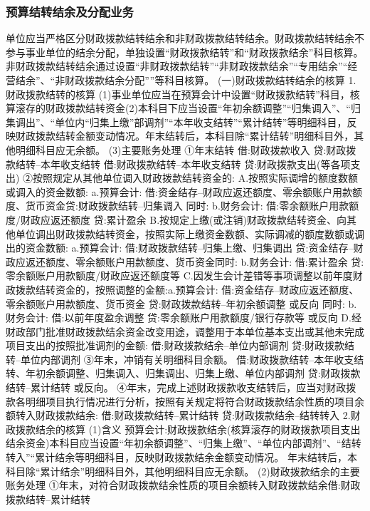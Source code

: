 \documentclass[UTF8,12pt]{ctexart}
\numberwithin{equation}{section} %
\numberwithin{figure}{section}
\numberwithin{table}{section}
\begin{document}
	\subsubsection{预算结转结余及分配业务}
	单位应当严格区分财政拨款结转结余和非财政拨款结转结余。财政拨款结转结余不参与事业单位的结余分配，单独设置“财政拨款结转”和“财政拨款结余”科目核算。
	非财政拨款结转结余通过设置“非财政拨款结转”“非财政拨款结余”“专用结余”“经营结余”、“非财政拨款结余分配””等科目核算。
	(一)财政拨款结转结余的核算
	1.财政拨款结转的核算
	(1)事业单位应当在预算会计中设置“财政拨款结转”科目，核算滚存的财政拨款结转资金(2)本科目下应当设置“年初余额调整”“归集调入”、“归集调出”、“单位内“归集上缴”部调剂”“本年收支结转”“累计结转”等明细科目，反映财政拨款结转金额变动情况。年末结转后，本科目除“累计结转”明细科目外，其他明细科目应无余额。
	(3)主要账务处理
	①年末结转
	借:财政拨款收入
	贷:财政拨款结转--本年收支结转
	借:财政拨款结转--本年收支结转
	贷:财政拨款支出(等各项支出)
	②按照规定从其他单位调入财政拨款结转资金的:
	A.按照实际调增的额度数额或调入的资金数额:
	a.预算会计:
	借:资金结存--财政应返还额度、零余额账户用款额度、货币资金贷:财政拨款结转--归集调入
	同时:
	b.财务会计:
	借:零余额账户用款额度/财政应返还额度
	贷:累计盈余
	B.按规定上缴(或注销)财政拨款结转资金、向其他单位调出财政拨款结转资金，按照实际上缴资金数额、实际调减的额度数额或调出的资金数额:
	a.预算会计:
	借:财政拨款结转--归集上缴、归集调出
	贷:资金结存--财政应返还额度、零余额账户用款额度、货币资金同时:
	b.财务会计:
	借:累计盈余
	贷:零余额账户用款额度/财政应返还额度等
	C.因发生会计差错等事项调整以前年度财政拨款结转资金的，按照调整的金额:a.预算会计:
	借:资金结存--财政应返还额度、零余额账户用款额度、货币资金
	贷:财政拨款结转--年初余额调整
	或反向
	同时:
	b.财务会计:
	借:以前年度盈余调整
	贷:零余额账户用款额度/银行存款等
	或反向
	D.经财政部门批准财政拨款结余资金改变用途，调整用于本单位基本支出或其他未完成项目支出的按照批准调剂的金额:
	借:财政拨款结余--单位内部调剂
	贷:财政拨款结转--单位内部调剂
	③年末，冲销有关明细科目余额。
	借:财政拨款结转--本年收支结转、年初余额调整、归集调入、归集调出、归集上缴、单位内部调剂
	贷:财政拨款结转--累计结转
	或反向。
	④年末，完成上述财政拨款收支结转后，应当对财政拨款各明细项目执行情况进行分析，按照有关规定将符合财政拨款结余性质的项目余额转入财政拨款结余:
	借:财政拨款结转--累计结转
	贷:财政拨款结余--结转转入
	2.财政拨款结余的核算
	(1)含义
	预算会计:财政拨款结余(核算滚存的财政拨款项目支出结余资金)本科目应当设置“年初余额调整”、“归集上缴”、“单位内部调剂”、“结转转入”“累计结余等明细科目，反映财政拨款结余金额变动情况。
	年末结转后，本科目除“累计结余”明细科目外，其他明细科目应无余额。
	(2)财政拨款结余的主要账务处理
	①年末，对符合财政拨款结余性质的项目余额转入财政拨款结余借:财政拨款结转--累计结转
\end{document}
